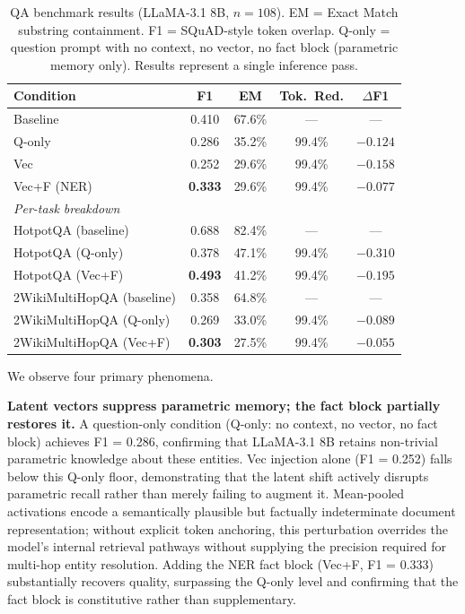 \documentclass[11pt]{article}
\begin{document}
\begin{table}[h]
\centering
\caption{QA benchmark results (LLaMA-3.1 8B, $n = 108$). EM = Exact Match substring containment. F1 = SQuAD-style token overlap. Q-only = question prompt with no context, no vector, no fact block (parametric memory only). Results represent a single inference pass.}
\label{tab:qa}
\begin{tabular}{lcccc}
\toprule
Condition & F1 & EM & Tok.\ Red. & $\Delta$F1 \\
\midrule
Baseline      & 0.410 & 67.6\% & ---    & --- \\
Q-only        & 0.286 & 35.2\% & 99.4\% & $-0.124$ \\
Vec           & 0.252 & 29.6\% & 99.4\% & $-0.158$ \\
Vec+F (NER)   & \textbf{0.333} & 29.6\% & 99.4\% & $-0.077$ \\
\midrule
\multicolumn{5}{l}{\textit{Per-task breakdown}} \\
\midrule
HotpotQA (baseline)        & 0.688 & 82.4\% & ---    & --- \\
HotpotQA (Q-only)          & 0.378 & 47.1\% & 99.4\% & $-0.310$ \\
HotpotQA (Vec+F)           & \textbf{0.493} & 41.2\% & 99.4\% & $-0.195$ \\
2WikiMultiHopQA (baseline) & 0.358 & 64.8\% & ---    & --- \\
2WikiMultiHopQA (Q-only)   & 0.269 & 33.0\% & 99.4\% & $-0.089$ \\
2WikiMultiHopQA (Vec+F)    & \textbf{0.303} & 27.5\% & 99.4\% & $-0.055$ \\
\bottomrule
\end{tabular}
\end{table}

We observe four primary phenomena.

\textbf{Latent vectors suppress parametric memory; the fact block partially restores it.} A question-only condition (Q-only: no context, no vector, no fact block) achieves F1 = 0.286, confirming that LLaMA-3.1 8B retains non-trivial parametric knowledge about these entities. Vec injection alone (F1 = 0.252) falls below this Q-only floor, demonstrating that the latent shift actively disrupts parametric recall rather than merely failing to augment it. Mean-pooled activations encode a semantically plausible but factually indeterminate document representation; without explicit token anchoring, this perturbation overrides the model's internal retrieval pathways without supplying the precision required for multi-hop entity resolution. Adding the NER fact block (Vec+F, F1 = 0.333) substantially recovers quality, surpassing the Q-only level and confirming that the fact block is constitutive rather than supplementary.
\end{document}

